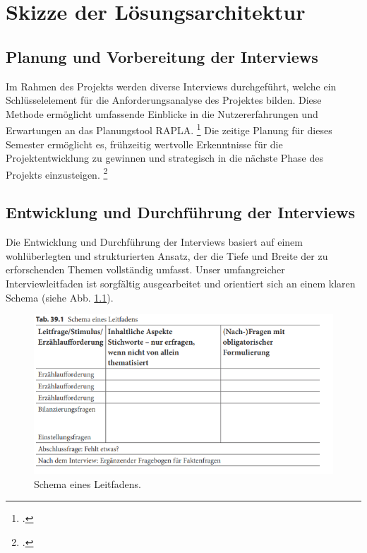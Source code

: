 \chapter{Skizze der Lösungsarchitektur}
\section{Planung und Vorbereitung der Interviews}
Im Rahmen des Projekts werden diverse Interviews durchgeführt, welche ein Schlüsselelement für die Anforderungsanalyse des Projektes bilden.
Diese Methode ermöglicht umfassende Einblicke in die Nutzererfahrungen und Erwartungen an das Planungstool \ac{RAPLA}.
\footcite[Vgl.][567]{baurHandbuchMethodenEmpirischen2014}
Die zeitige Planung für dieses Semester ermöglicht es, frühzeitig wertvolle Erkenntnisse für die Projektentwicklung zu gewinnen und
strategisch in die nächste Phase des Projekts einzusteigen.
\footcite[Vgl.][568]{baurHandbuchMethodenEmpirischen2014}

\section{Entwicklung und Durchführung der Interviews}
Die Entwicklung und Durchführung der Interviews basiert auf einem wohlüberlegten und
strukturierten Ansatz, der die Tiefe und Breite der zu erforschenden Themen vollständig umfasst.
Unser umfangreicher Interviewleitfaden ist sorgfältig ausgearbeitet und orientiert
sich an einem klaren Schema (siehe Abb. \ref{abb:leitfaden}).
\begin{figure}[H]
    \centering
    \includegraphics[width=0.9\linewidth]{graphics/leitfaden.png}
    \caption[Schema eines Leitfadens.]{Schema eines Leitfadens.\protect\footnotemark}\label{abb:leitfaden}
\end{figure}

